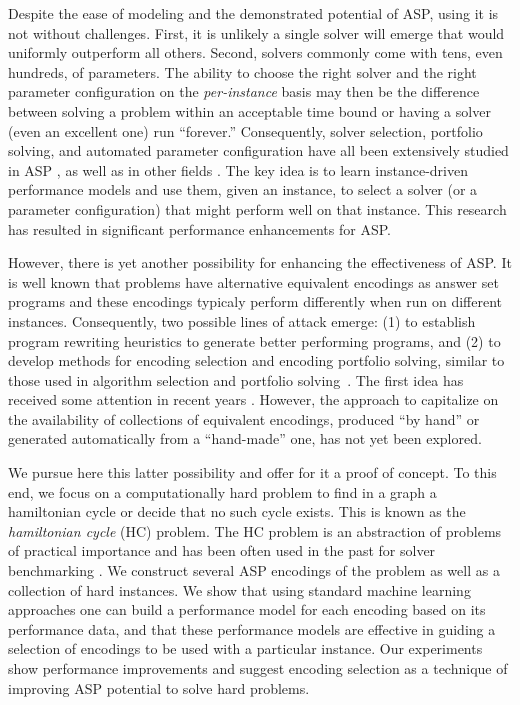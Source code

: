 \documentclass{new_tlp}
\begin{document}
Despite the ease of modeling and the demonstrated potential of ASP, using it is 
not without challenges. First, it is unlikely a single solver will emerge
that would uniformly outperform all others. Second, solvers commonly come
with tens, even hundreds, of parameters. The ability to choose the right 
solver and the right parameter configuration on the \emph{per-instance} 
basis may then be the difference between solving a problem within an acceptable 
time bound or having a solver (even an excellent one) run ``forever.'' 
Consequently, 
solver selection, portfolio solving, and automated parameter configuration 
have all been extensively studied in ASP \cite{MarateaPR14,HoosLS14}, as well as 
in other fields \cite{Rice76,KerschkeHNT19}. The key idea is to learn
instance-driven performance models and use them, given an instance, to
select a solver (or a parameter configuration) that might perform well
on that instance. 
This research has resulted in significant performance enhancements for ASP. 

However, there is yet another possibility for enhancing the effectiveness 
of ASP. It is well known that problems have alternative equivalent encodings 
as answer set programs and these encodings typicaly perform differently when 
run on different instances. Consequently, two possible lines of attack emerge: 
(1) to establish program rewriting heuristics to generate better performing 
programs, and (2) to develop methods for encoding selection and encoding 
portfolio solving, similar to those used in algorithm selection and 
portfolio solving~\cite{GomesS01,HoosLS14}. The first idea has received some 
attention in recent years \cite{BuddenhagenL15,BichlerMW16,HippenL19}. 
However, the approach to capitalize on the availability of collections of 
equivalent encodings, produced ``by hand'' or generated automatically from 
a ``hand-made'' one, has not yet been explored.

We pursue here this latter possibility and offer for it a proof of concept.
To this end, we focus on a computationally hard problem to find in a graph
a hamiltonian cycle or decide that no such cycle exists. This is known
as the \emph{hamiltonian cycle} (HC) problem. The HC problem is an abstraction 
of problems of practical importance and has been often used in the past for 
solver benchmarking \cite{1staspcomp,2ndaspcomp}. We construct several ASP encodings of 
the problem as well as a collection of hard instances. We show that using 
standard machine learning approaches one can build a performance model for
each encoding based on its performance data, and that these performance models 
are effective in guiding a selection of encodings to be used with a particular 
instance. Our experiments show performance improvements and suggest encoding 
selection as a technique of improving ASP potential to solve hard problems.
\end{document}
